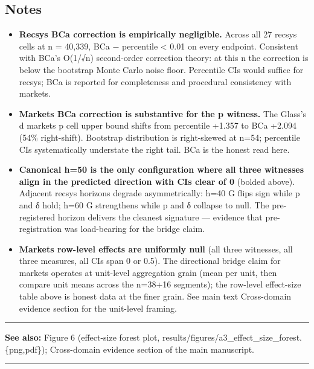 \documentclass[
  11pt,
]{article}
\begin{document}
\subsection{Notes}\label{notes}

\begin{itemize}
\item
  \textbf{Recsys BCa correction is empirically negligible.} Across all
  27 recsys cells at n = 40,339, \textbar BCa − percentile\textbar{}
  \textless{} 0.01 on every endpoint. Consistent with BCa's O(1/√n)
  second-order correction theory: at this n the correction is below the
  bootstrap Monte Carlo noise floor. Percentile CIs would suffice for
  recsys; BCa is reported for completeness and procedural consistency
  with markets.
\item
  \textbf{Markets BCa correction is substantive for the p witness.} The
  Glass's d markets p cell upper bound shifts from percentile +1.357 to
  BCa +2.094 (54\% right-shift). Bootstrap distribution is right-skewed
  at n=54; percentile CIs systematically understate the right tail. BCa
  is the honest read here.
\item
  \textbf{Canonical h=50 is the only configuration where all three
  witnesses align in the predicted direction with CIs clear of 0}
  (bolded above). Adjacent recsys horizons degrade asymmetrically: h=40
  G flips sign while p and δ hold; h=60 G strengthens while p and δ
  collapse to null. The pre-registered horizon delivers the cleanest
  signature --- evidence that pre-registration was load-bearing for the
  bridge claim.
\item
  \textbf{Markets row-level effects are uniformly null} (all three
  witnesses, all three measures, all CIs span 0 or 0.5). The directional
  bridge claim for markets operates at unit-level aggregation grain
  (mean per unit, then compare unit means across the n=38+16 segments);
  the row-level effect-size table above is honest data at the finer
  grain. See main text Cross-domain evidence section for the unit-level
  framing.
\end{itemize}

\begin{center}\rule{0.5\linewidth}{0.5pt}\end{center}

\textbf{See also:} Figure 6 (effect-size forest plot,
results/figures/a3\_effect\_size\_forest.\{png,pdf\}); Cross-domain
evidence section of the main manuscript.

\begin{center}\rule{0.5\linewidth}{0.5pt}\end{center}
\end{document}
